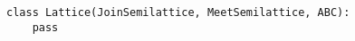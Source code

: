 \par\begin{minipage}{60ex}
\begin{verbatim}
class Lattice(JoinSemilattice, MeetSemilattice, ABC):
    pass
\end{verbatim}
\end{minipage}\par